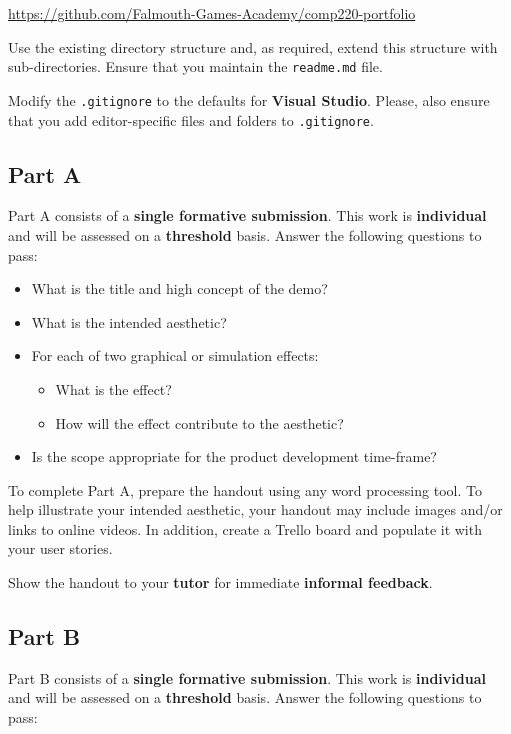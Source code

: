 \documentclass{../../fal_assignment}
\begin{document}
\indent \url{https://github.com/Falmouth-Games-Academy/comp220-portfolio}

Use the existing directory structure and, as required, extend this structure with sub-directories.
Ensure that you maintain the \texttt{readme.md} file.

Modify the \texttt{.gitignore} to the defaults for \textbf{Visual Studio}.
Please, also ensure that you add editor-specific files and folders to \texttt{.gitignore}. 

\subsection*{Part A}

Part A consists of a \textbf{single formative submission}. This work is \textbf{individual} and will be assessed on a \textbf{threshold} basis. Answer the following questions to pass:

\begin{itemize}
	\item What is the title and high concept of the demo?
	\item What is the intended aesthetic?
	\item For each of two graphical or simulation effects:
	\begin{itemize}
		\item What is the effect?
		\item How will the effect contribute to the aesthetic?
	\end{itemize}
	\item Is the scope appropriate for the product development time-frame?
\end{itemize}

To complete Part A, prepare the handout using any word processing tool.
To help illustrate your intended aesthetic, your handout may include images and/or links to online videos.
In addition, create a Trello board and populate it with your user stories.

Show the handout to your \textbf{tutor} for immediate \textbf{informal feedback}.

\subsection*{Part B}

Part B consists of a \textbf{single formative submission}. This work is \textbf{individual} and will be assessed on a \textbf{threshold} basis. Answer the following questions to pass:
\end{document}
